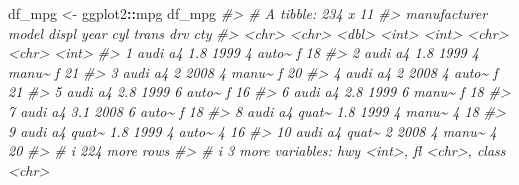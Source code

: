 \documentclass[
  xelatex, ja=standard]{bxjsbook}
\newenvironment{Shaded}{\begin{snugshade}}{\end{snugshade}}
\newcommand{\CommentTok}[1]{\textcolor[rgb]{0.56,0.35,0.01}{\textit{#1}}}
\newcommand{\NormalTok}[1]{#1}
\newcommand{\OtherTok}[1]{\textcolor[rgb]{0.56,0.35,0.01}{#1}}
\newcommand{\SpecialCharTok}[1]{\textcolor[rgb]{0.81,0.36,0.00}{\textbf{#1}}}
\theoremstyle{definition}
\theoremstyle{definition}
\theoremstyle{definition}
\theoremstyle{definition}
\theoremstyle{remark}
\begin{document}
\begin{Shaded}
\begin{Highlighting}[]
\NormalTok{df\_mpg }\OtherTok{\textless{}{-}}\NormalTok{ ggplot2}\SpecialCharTok{::}\NormalTok{mpg}
\NormalTok{df\_mpg}
\CommentTok{\#\textgreater{} \# A tibble: 234 x 11}
\CommentTok{\#\textgreater{}    manufacturer model    displ  year   cyl trans drv     cty}
\CommentTok{\#\textgreater{}    \textless{}chr\textgreater{}        \textless{}chr\textgreater{}    \textless{}dbl\textgreater{} \textless{}int\textgreater{} \textless{}int\textgreater{} \textless{}chr\textgreater{} \textless{}chr\textgreater{} \textless{}int\textgreater{}}
\CommentTok{\#\textgreater{}  1 audi         a4         1.8  1999     4 auto\textasciitilde{} f        18}
\CommentTok{\#\textgreater{}  2 audi         a4         1.8  1999     4 manu\textasciitilde{} f        21}
\CommentTok{\#\textgreater{}  3 audi         a4         2    2008     4 manu\textasciitilde{} f        20}
\CommentTok{\#\textgreater{}  4 audi         a4         2    2008     4 auto\textasciitilde{} f        21}
\CommentTok{\#\textgreater{}  5 audi         a4         2.8  1999     6 auto\textasciitilde{} f        16}
\CommentTok{\#\textgreater{}  6 audi         a4         2.8  1999     6 manu\textasciitilde{} f        18}
\CommentTok{\#\textgreater{}  7 audi         a4         3.1  2008     6 auto\textasciitilde{} f        18}
\CommentTok{\#\textgreater{}  8 audi         a4 quat\textasciitilde{}   1.8  1999     4 manu\textasciitilde{} 4        18}
\CommentTok{\#\textgreater{}  9 audi         a4 quat\textasciitilde{}   1.8  1999     4 auto\textasciitilde{} 4        16}
\CommentTok{\#\textgreater{} 10 audi         a4 quat\textasciitilde{}   2    2008     4 manu\textasciitilde{} 4        20}
\CommentTok{\#\textgreater{} \# i 224 more rows}
\CommentTok{\#\textgreater{} \# i 3 more variables: hwy \textless{}int\textgreater{}, fl \textless{}chr\textgreater{}, class \textless{}chr\textgreater{}}
\end{Highlighting}
\end{Shaded}
\end{document}
